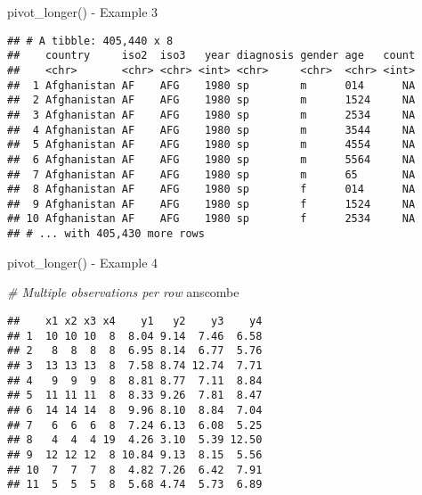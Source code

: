 \documentclass[
  ignorenonframetext,
]{beamer}
\newenvironment{Shaded}{\begin{snugshade}}{\end{snugshade}}
\newcommand{\CommentTok}[1]{\textcolor[rgb]{0.56,0.35,0.01}{\textit{#1}}}
\newcommand{\DataTypeTok}[1]{\textcolor[rgb]{0.13,0.29,0.53}{#1}}
\newcommand{\KeywordTok}[1]{\textcolor[rgb]{0.13,0.29,0.53}{\textbf{#1}}}
\newcommand{\NormalTok}[1]{#1}
\newcommand{\OperatorTok}[1]{\textcolor[rgb]{0.81,0.36,0.00}{\textbf{#1}}}
\newcommand{\StringTok}[1]{\textcolor[rgb]{0.31,0.60,0.02}{#1}}
\begin{document}
\begin{frame}[fragile]{pivot\_longer() - Example 3}
\protect\hypertarget{pivot_longer---example-3-1}{}

\begin{Shaded}
\end{Shaded}

\begin{verbatim}
## # A tibble: 405,440 x 8
##    country     iso2  iso3   year diagnosis gender age   count
##    <chr>       <chr> <chr> <int> <chr>     <chr>  <chr> <int>
##  1 Afghanistan AF    AFG    1980 sp        m      014      NA
##  2 Afghanistan AF    AFG    1980 sp        m      1524     NA
##  3 Afghanistan AF    AFG    1980 sp        m      2534     NA
##  4 Afghanistan AF    AFG    1980 sp        m      3544     NA
##  5 Afghanistan AF    AFG    1980 sp        m      4554     NA
##  6 Afghanistan AF    AFG    1980 sp        m      5564     NA
##  7 Afghanistan AF    AFG    1980 sp        m      65       NA
##  8 Afghanistan AF    AFG    1980 sp        f      014      NA
##  9 Afghanistan AF    AFG    1980 sp        f      1524     NA
## 10 Afghanistan AF    AFG    1980 sp        f      2534     NA
## # ... with 405,430 more rows
\end{verbatim}

\end{frame}

\begin{frame}[fragile]{pivot\_longer() - Example 4}
\protect\hypertarget{pivot_longer---example-4}{}

\begin{Shaded}
\begin{Highlighting}[]
\CommentTok{# Multiple observations per row}
\NormalTok{anscombe}
\end{Highlighting}
\end{Shaded}

\begin{verbatim}
##    x1 x2 x3 x4    y1   y2    y3    y4
## 1  10 10 10  8  8.04 9.14  7.46  6.58
## 2   8  8  8  8  6.95 8.14  6.77  5.76
## 3  13 13 13  8  7.58 8.74 12.74  7.71
## 4   9  9  9  8  8.81 8.77  7.11  8.84
## 5  11 11 11  8  8.33 9.26  7.81  8.47
## 6  14 14 14  8  9.96 8.10  8.84  7.04
## 7   6  6  6  8  7.24 6.13  6.08  5.25
## 8   4  4  4 19  4.26 3.10  5.39 12.50
## 9  12 12 12  8 10.84 9.13  8.15  5.56
## 10  7  7  7  8  4.82 7.26  6.42  7.91
## 11  5  5  5  8  5.68 4.74  5.73  6.89
\end{verbatim}

\end{frame}
\end{document}
